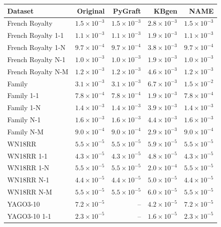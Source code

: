 \begin{tabular}{lrrrr}
\toprule
Dataset & Original & PyGraft & KBgen & NAME \\
\midrule
French Royalty & $1.5\times10^{-3}$ & $1.5\times10^{-3}$ & $2.8\times10^{-3}$ & $1.5\times10^{-3}$ \\
French Royalty 1-1 & $1.1\times10^{-3}$ & $1.1\times10^{-3}$ & $1.9\times10^{-3}$ & $1.1\times10^{-3}$ \\
French Royalty 1-N & $9.7\times10^{-4}$ & $9.7\times10^{-4}$ & $3.8\times10^{-3}$ & $9.7\times10^{-4}$ \\
French Royalty N-1 & $1.0\times10^{-3}$ & $1.0\times10^{-3}$ & $1.9\times10^{-3}$ & $1.0\times10^{-3}$ \\
French Royalty N-M & $1.2\times10^{-3}$ & $1.2\times10^{-3}$ & $4.6\times10^{-3}$ & $1.2\times10^{-3}$ \\
\midrule
Family & $3.1\times10^{-3}$ & $3.1\times10^{-3}$ & $6.7\times10^{-3}$ & $1.5\times10^{-2}$ \\
Family 1-1 & $7.8\times10^{-4}$ & $7.8\times10^{-4}$ & $1.9\times10^{-3}$ & $7.8\times10^{-4}$ \\
Family 1-N & $1.4\times10^{-3}$ & $1.4\times10^{-3}$ & $3.9\times10^{-3}$ & $1.4\times10^{-3}$ \\
Family N-1 & $1.6\times10^{-3}$ & $1.6\times10^{-3}$ & $4.4\times10^{-3}$ & $1.6\times10^{-3}$ \\
Family N-M & $9.0\times10^{-4}$ & $9.0\times10^{-4}$ & $2.9\times10^{-3}$ & $9.0\times10^{-4}$ \\
\midrule
WN18RR & $5.5\times10^{-5}$ & $5.5\times10^{-5}$ & $5.9\times10^{-5}$ & $5.5\times10^{-5}$ \\
WN18RR 1-1 & $4.3\times10^{-5}$ & $4.3\times10^{-5}$ & $4.8\times10^{-5}$ & $4.3\times10^{-5}$ \\
WN18RR 1-N & $5.5\times10^{-5}$ & $5.5\times10^{-5}$ & $2.0\times10^{-4}$ & $5.5\times10^{-5}$ \\
WN18RR N-1 & $4.4\times10^{-5}$ & $4.4\times10^{-5}$ & $5.0\times10^{-5}$ & $4.4\times10^{-5}$ \\
WN18RR N-M & $5.5\times10^{-5}$ & $5.5\times10^{-5}$ & $6.0\times10^{-5}$ & $5.5\times10^{-5}$ \\
\midrule
YAGO3-10 & $7.2\times10^{-5}$ & – & $4.2\times10^{-5}$ & $7.2\times10^{-5}$ \\
YAGO3-10 1-1 & $2.3\times10^{-5}$ & – & $1.6\times10^{-5}$ & $2.3\times10^{-5}$ \\

\end{tabular}
